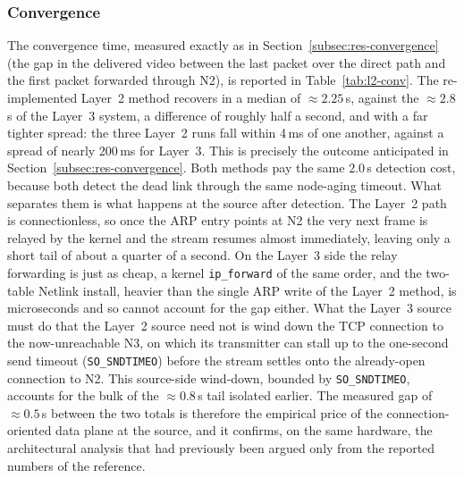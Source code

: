\subsubsection{Convergence}

The convergence time, measured exactly as in
Section~\ref{subsec:res-convergence} (the gap in the delivered video between the
last packet over the direct path and the first packet forwarded through N2), is
reported in Table~\ref{tab:l2-conv}. The re-implemented Layer~2 method recovers
in a median of $\approx 2.25$\,s, against the $\approx 2.8$\,s of the Layer~3
system, a difference of roughly half a second, and with a far tighter spread:
the three Layer~2 runs fall within 4\,ms of one another, against a spread of
nearly 200\,ms for Layer~3. This is precisely the outcome anticipated in
Section~\ref{subsec:res-convergence}. Both methods pay the same $2.0$\,s
detection cost, because both detect the dead link through the same node-aging
timeout. What separates them is what happens at the source after detection.
The Layer~2 path is connectionless, so once the ARP entry points at N2 the very
next frame is relayed by the kernel and the stream resumes almost immediately,
leaving only a short tail of about a quarter of a second. On the Layer~3 side
the relay forwarding is just as cheap, a kernel \texttt{ip\_forward} of the same
order, and the two-table Netlink install, heavier than the single ARP write of
the Layer~2 method, is microseconds and so cannot account for the gap either.
What the Layer~3 source must do that the Layer~2 source need not is wind down
the TCP connection to the now-unreachable N3, on which its transmitter can stall
up to the one-second send timeout (\texttt{SO\_SNDTIMEO}) before the stream
settles onto the already-open connection to N2. This source-side wind-down,
bounded by \texttt{SO\_SNDTIMEO}, accounts for the bulk of the $\approx 0.8$\,s
tail isolated earlier. The measured gap of $\approx 0.5$\,s between the two
totals is therefore the empirical price of the connection-oriented data plane at
the source, and it confirms, on the same hardware, the architectural analysis
that had previously been argued only from the reported numbers of the reference.

